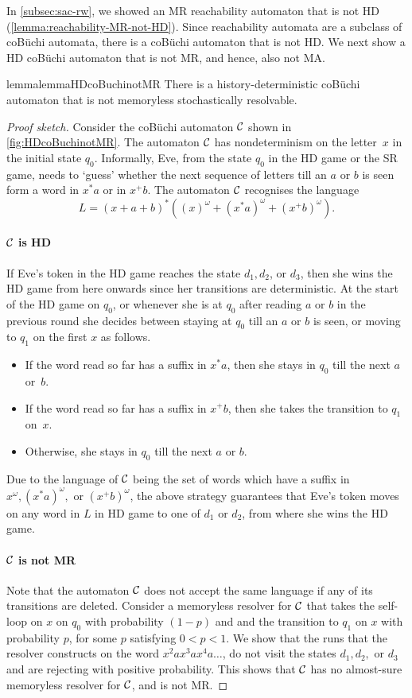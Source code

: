 In \cref{subsec:sac-rw}, we showed an MR reachability automaton that is not HD (\cref{lemma:reachability-MR-not-HD}). Since reachability automata are a subclass of coB\"uchi automata, there is a coB\"uchi automaton that is not HD. We next show a HD coB\"uchi automaton that is not MR, and hence, also not MA. 
\begin{restatable}{lemma}{lemmaHDcoBuchinotMR}\label{lemma:HDcoBuchinotMR}
      There is a history-deterministic coB\"uchi automaton that is not memoryless stochastically resolvable.
\end{restatable}
\begin{proof}[Proof sketch]
    Consider the coB\"uchi automaton $\mathcal{C}$ shown in \cref{fig:HDcoBuchinotMR}. The automaton $\mathcal{C}$ has nondeterminism on the letter~$x$ in the initial state $q_0$. Informally, Eve, from the state $q_0$ in the HD game or the SR game, needs to `guess' whether the next sequence of letters till an $a$ or $b$ is seen form a word in $x^* a$ or in $x^+ b$. The automaton $\mathcal{C}$
    recognises the language $$L=(x+a+b)^{*} ((x)^{\omega} + (x^* a)^{\omega} + (x^+ b)^{\omega}).$$ 
    \paragraph*{$\mathcal{C}$ is HD}  If Eve's token in the HD game reaches the state $d_1,d_2$, or $d_3$, then she wins the HD game from here onwards since her transitions are deterministic. At the start of the HD game on $q_0$, or whenever she is at $q_0$ after reading $a$ or $b$ in the previous round she decides between staying at $q_0$ till an $a$ or $b$ is seen, or moving to $q_1$ on the first $x$ as follows.
    \begin{itemize}
        \item If the word read so far has a suffix in $x^{*}a$, then she stays in $q_0$ till the next $a$ or~$b$.
        \item If the word read so far has a suffix in $x^{+}b$, then she takes the transition to $q_1$ on~$x$.
        \item Otherwise, she stays in $q_0$ till the next $a$ or $b$.
    \end{itemize}
    Due to the language of $\mathcal{C}$ being the set of words which have a suffix in $x^{\omega},(x^{*}a)^{\omega},$ or $(x^+b)^{\omega}$, the above strategy guarantees that Eve's token moves on any word in $L$ in HD game to one of $d_1$ or $d_2$, from where she wins the HD game.
    \paragraph*{$\mathcal{C}$ is not MR} Note that the automaton $\mathcal{C}$ does not accept the same language if any of its transitions are deleted. Consider a memoryless resolver for $\mathcal{C}$ that takes the self-loop on $x$ on $q_0$ with probability $(1-p)$ and and the transition to $q_1$ on $x$ with probability $p$, for some $p$ satisfying $0<p<1$. We show that the runs that the resolver constructs on the word $x^2 a x^3 a x^4 a \dots$, do not visit the states $d_1,d_2,$ or $d_3$ and are rejecting with positive probability. This shows that $\mathcal{C}$ has no almost-sure memoryless resolver for $\mathcal{C}$, and is not MR.
\end{proof}

